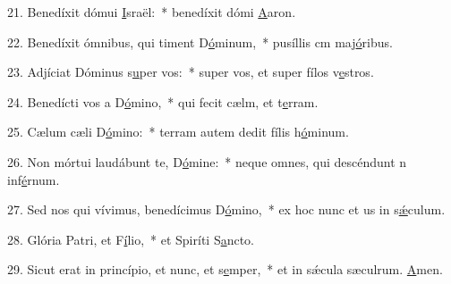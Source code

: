 21. Benedíxit dómui \uline{I}sraël:~* benedíxit dómi \uline{A}aron.\par 
22. Benedíxit ómnibus, qui timent D\uline{ó}minum,~* pusíllis cm maj\uline{ó}ribus.\par 
23. Adjíciat Dóminus s\uline{u}per vos:~* super vos, et super fílos v\uline{e}stros.\par 
24. Benedícti vos a D\uline{ó}mino,~* qui fecit cælm, et t\uline{e}rram.\par 
25. Cælum cæli D\uline{ó}mino:~* terram autem dedit fílis h\uline{ó}minum.\par 
26. Non mórtui laudábunt te, D\uline{ó}mine:~* neque omnes, qui descéndunt n inf\uline{é}rnum.\par 
27. Sed nos qui vívimus, benedícimus D\uline{ó}mino,~* ex hoc nunc et us in s\uline{ǽ}culum.\par 
28. Glória Patri, et F\uline{í}lio,~* et Spiríti S\uline{a}ncto.\par 
29. Sicut erat in princípio, et nunc, et s\uline{e}mper,~* et in sǽcula sæculrum. \uline{A}men.\par 
